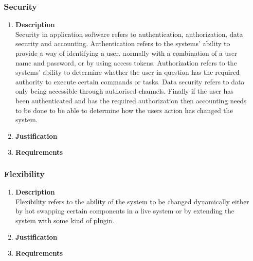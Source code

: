 \documentclass[a4paper,10pt]{article}
\begin{document}
	\subsubsection{Security}
		\begin{enumerate}
			\item \textbf{Description} \\
				Security in application software refers to authentication, authorization, data security and accounting. Authentication refers to the systems' ability to provide a way of identifying a user, normally with a combination of a user name and password, or by using access tokens. Authorization refers to the systems' ability to determine whether the user in question has the required authority to execute certain commands or tasks. Data security refers to data only being accessible through authorised channels. Finally if the user has been authenticated and has the required authorization then accounting needs to be done to be able to determine how the users action has changed the system.  

			\item \textbf{Justification} \\
			\item \textbf{Requirements}\\
		\end{enumerate}

	\subsubsection{Flexibility}
		\begin{enumerate}
			\item \textbf{Description} \\
				Flexibility refers to the ability of the system to be changed dynamically either by hot swapping certain components in a live system or by extending the system with some kind of plugin. 

			\item \textbf{Justification} \\
			\item \textbf{Requirements}\\
		\end{enumerate}
\end{document}
